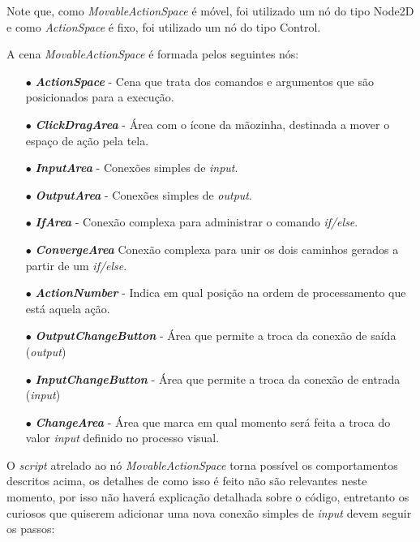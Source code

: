 Note que, como \textit{MovableActionSpace} é móvel, foi utilizado um nó do tipo
Node2D e como \textit{ActionSpace} é fixo, foi utilizado um nó do tipo Control.

A cena \textit{MovableActionSpace} é formada pelos seguintes nós:

\begin{itemize}
    \item[$\bullet$]
        \textbf{\textit{ActionSpace}} - Cena que trata dos comandos e argumentos
        que são posicionados para a execução.   
    \item[$\bullet$]
        \textbf{\textit{ClickDragArea}} - Área com o ícone da mãozinha, 
        destinada a mover o espaço de ação pela tela. 
    \item[$\bullet$]
        \textbf{\textit{InputArea}} - Conexões simples de \textit{input}.
    \item[$\bullet$]
        \textbf{\textit{OutputArea}} - Conexões simples de \textit{output}.  
    \item[$\bullet$]
        \textbf{\textit{IfArea}} - Conexão complexa para administrar o comando 
        \textit{if/else}.
    \item[$\bullet$]
        \textbf{\textit{ConvergeArea}} Conexão complexa para unir os dois 
        caminhos gerados a partir de um \textit{if/else}.
    \item[$\bullet$]
        \textbf{\textit{ActionNumber}} - Indica em qual posição na ordem de 
        processamento que está aquela ação.
    \item[$\bullet$]
        \textbf{\textit{OutputChangeButton}} - Área que permite a troca da 
        conexão de saída (\textit{output})
    \item[$\bullet$]
        \textbf{\textit{InputChangeButton}} - Área que permite a troca da 
        conexão de entrada (\textit{input})
    \item[$\bullet$] 
        \textbf{\textit{ChangeArea}} - Área que marca em qual momento será feita
        a troca do valor \textit{input} definido no processo visual.
\end{itemize}

O \textit{script} atrelado ao nó \textit{MovableActionSpace} torna possível
os comportamentos descritos acima, os detalhes de como isso é feito não são
relevantes neste momento, por isso não haverá explicação detalhada sobre o 
código, entretanto os curiosos que quiserem adicionar uma nova conexão simples
de \textit{input} devem seguir os passos:

